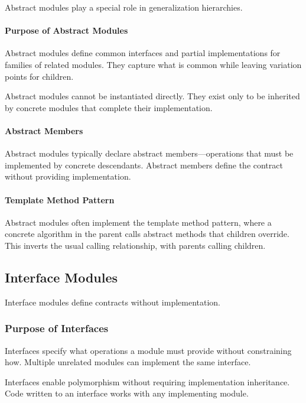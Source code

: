 \documentclass[11pt]{article}
\begin{document}
Abstract modules play a special role in generalization hierarchies.

\paragraph{Purpose of Abstract Modules}

Abstract modules define common interfaces and partial implementations for families of related modules. They capture what is common while leaving variation points for children.

Abstract modules cannot be instantiated directly. They exist only to be inherited by concrete modules that complete their implementation.

\paragraph{Abstract Members}

Abstract modules typically declare abstract members---operations that must be implemented by concrete descendants. Abstract members define the contract without providing implementation.

\paragraph{Template Method Pattern}

Abstract modules often implement the template method pattern, where a concrete algorithm in the parent calls abstract methods that children override. This inverts the usual calling relationship, with parents calling children.

\subsection{Interface Modules}

Interface modules define contracts without implementation.

\subsubsection{Purpose of Interfaces}

Interfaces specify what operations a module must provide without constraining how. Multiple unrelated modules can implement the same interface.

Interfaces enable polymorphism without requiring implementation inheritance. Code written to an interface works with any implementing module.
\end{document}
